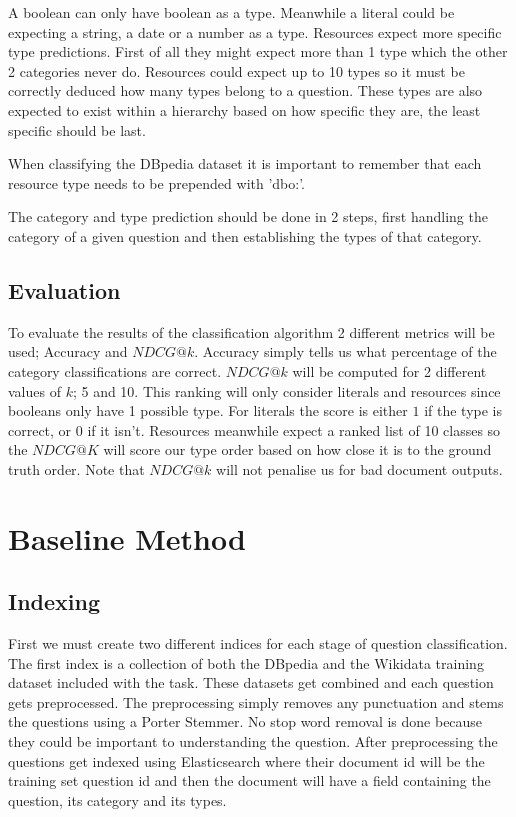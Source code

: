 \documentclass[sigconf]{acmart}
\begin{document}
A boolean can only have boolean as a type. Meanwhile a literal could be expecting a string, a date or a number as a type. Resources expect more specific type predictions. First of all they might expect more than 1 type which the other 2 categories never do. Resources could expect up to 10 types so it must be correctly deduced how many types belong to a question. These types are also expected to exist within a hierarchy based on how specific they are, the least specific should be last.

When classifying the DBpedia dataset it is important to remember that each resource type needs to be prepended with 'dbo:'.

The category and type prediction should be done in 2 steps, first handling the category of a given question and then establishing the types of that category.

\subsection{Evaluation}
To evaluate the results of the classification algorithm 2 different metrics will be used; Accuracy and $NDCG@k$. Accuracy simply tells us what percentage of the category classifications are correct. $NDCG@k$ will be computed for 2 different values of $k$; 5 and 10. This ranking will only consider literals and resources since booleans only have 1 possible type. For literals the score is either $1$ if the type is correct, or $0$ if it isn't. Resources meanwhile expect a ranked list of 10 classes so the $NDCG@K$ will score our type order based on how close it is to the ground truth order. Note that $NDCG@k$ will not penalise us for bad document outputs. 

\section{Baseline Method}
\subsection{Indexing}
First we must create two different indices for each stage of question classification. The first index is a collection of both the DBpedia and the Wikidata training dataset included with the task. These datasets get combined and each question gets preprocessed. The preprocessing simply removes any punctuation and stems the questions using a Porter Stemmer. No stop word removal is done because they could be important to understanding the question. After preprocessing the questions get indexed using Elasticsearch where their document id will be the training set question id and then the document will have a field containing the question, its category and its types. 
\end{document}
